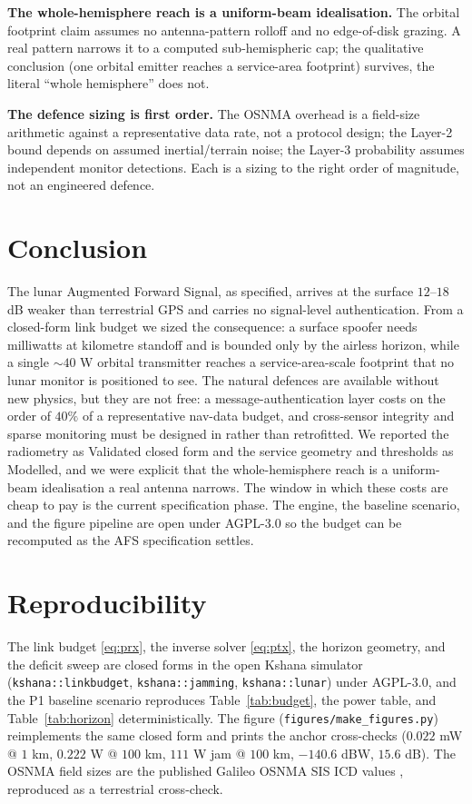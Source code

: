 \documentclass[conference]{IEEEtran}
\begin{document}
\textbf{The whole-hemisphere reach is a uniform-beam idealisation.} The orbital
footprint claim assumes no antenna-pattern rolloff and no edge-of-disk grazing. A
real pattern narrows it to a computed sub-hemispheric cap; the qualitative
conclusion (one orbital emitter reaches a service-area footprint) survives, the
literal ``whole hemisphere'' does not.

\textbf{The defence sizing is first order.} The OSNMA overhead is a field-size
arithmetic against a representative data rate, not a protocol design; the Layer-2
bound depends on assumed inertial/terrain noise; the Layer-3 probability assumes
independent monitor detections. Each is a sizing to the right order of magnitude, not
an engineered defence.

\section{Conclusion}
The lunar Augmented Forward Signal, as specified, arrives at the surface $12$--$18$
dB weaker than terrestrial GPS and carries no signal-level authentication. From a
closed-form link budget we sized the consequence: a surface spoofer needs
milliwatts at kilometre standoff and is bounded only by the airless horizon, while a
single $\sim$$40$ W orbital transmitter reaches a service-area-scale footprint that
no lunar monitor is positioned to see. The natural defences are available without new
physics, but they are not free: a message-authentication layer costs on the order of
$40\%$ of a representative nav-data budget, and cross-sensor integrity and sparse
monitoring must be designed in rather than retrofitted. We reported the radiometry as
Validated closed form and the service geometry and thresholds as Modelled, and we
were explicit that the whole-hemisphere reach is a uniform-beam idealisation a real
antenna narrows. The window in which these costs are cheap to pay is the current
specification phase. The engine, the baseline scenario, and the figure pipeline are
open under AGPL-3.0 so the budget can be recomputed as the AFS specification settles.

\section*{Reproducibility}
The link budget \eqref{eq:prx}, the inverse solver \eqref{eq:ptx}, the horizon
geometry, and the deficit sweep are closed forms in the open Kshana simulator
\cite{kshana} (\texttt{kshana::linkbudget}, \texttt{kshana::jamming},
\texttt{kshana::lunar}) under AGPL-3.0, and the P1 baseline scenario reproduces
Table~\ref{tab:budget}, the power table, and Table~\ref{tab:horizon} deterministically.
The figure (\texttt{figures/make\_figures.py}) reimplements the same closed form and
prints the anchor cross-checks ($0.022$ mW @ $1$ km, $0.222$ W @ $100$ km, $111$ W jam
@ $100$ km, $-140.6$ dBW, $15.6$ dB). The OSNMA field sizes are the published Galileo
OSNMA SIS ICD values \cite{osnmaicd}, reproduced as a terrestrial cross-check.
\end{document}
